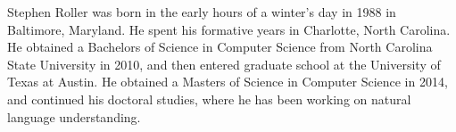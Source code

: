 \documentclass[12pt,letter]{report}
\renewcommand{\chosenspacing}{\oneandhalfspace}  %
\renewcommand{\thesisdedication}{To my sisters, Lindsey and Kacie.}
\begin{document}
\thesiscopyrightpage                 %

\thesiscertificationpage             %

\thesistitlepage                     %


\thesisdedicationpage                %

\renewcommand{\thesisdedication}{\parbox[c]{4in}{``I don't know the meaning of half those long words, and, what's more,
    I don't believe you do either!''\begin{flushright}-- Lewis Carroll, \textit{Alice's Adventures in
Wonderland}\end{flushright}}}
\thesisdedicationpage                %

{}  %
\begin{thesisacknowledgments}        %

\end{thesisacknowledgments}          %


{}
\begin{thesisabstract}               %
\chosenspacing
\indent
\end{thesisabstract}

\tableofcontents                     %






\clearpage
{}
{}  %
\singlespace



\begin{thesisauthorvita}
Stephen Roller was born in the early hours of a winter's day in 1988 in
Baltimore, Maryland. He spent his formative years in Charlotte, North
Carolina. He obtained a Bachelors of Science in Computer Science from
North Carolina State University in 2010, and then entered graduate school
at the University of Texas at Austin. He obtained a Masters of Science in
Computer Science in 2014, and continued his doctoral studies, where he
has been working on natural language understanding.
\end{thesisauthorvita}
\end{document}
